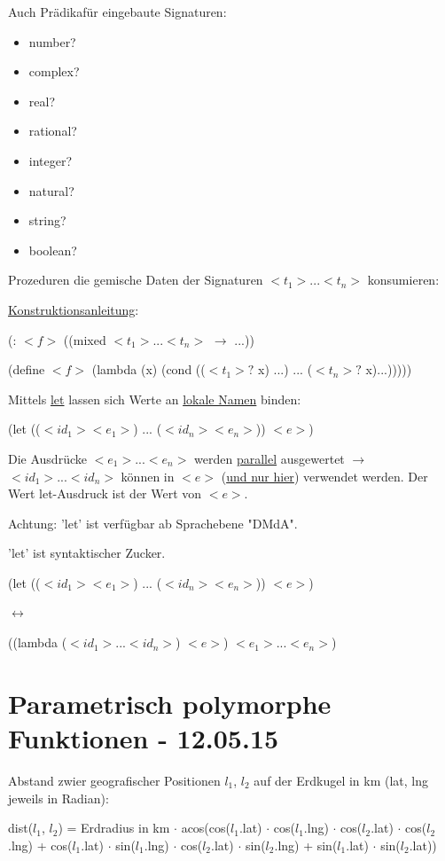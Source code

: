 \documentclass[a4paper, 20pt, openany]{book}
\begin{document}
Auch Prädikafür eingebaute Signaturen:

\begin{itemize}
  \item number?
  \item complex?
  \item real?
  \item rational?
  \item integer?
  \item natural?
  \item string?
  \item boolean?
\end{itemize}

Prozeduren die gemische Daten der Signaturen $<t_1>...<t_n>$ konsumieren:

\underline{Konstruktionsanleitung}:

(: $<f>$ ((mixed $<t_1>...<t_n>$ $\rightarrow$ ...))

(define $<f>$ (lambda (x) (cond (($<t_1>?$ x) ...) ... ($<t_n>?$ x)...)))))

Mittels \underline{let} lassen sich Werte an \underline{lokale Namen} binden:

\begin{center}
  (let (($<id_1> <e_1>$) ... ($<id_n> <e_n>$)) $<e>$)
\end{center}

Die Ausdrücke $<e_1>...<e_n>$ werden \underline{parallel} ausgewertet $\rightarrow$ $<id_1>...<id_n>$ können in $<e>$ (\underline{und nur hier}) verwendet werden. Der Wert let-Ausdruck ist der Wert von $<e>$.

Achtung: 'let' ist verfügbar ab Sprachebene "DMdA".

'let' ist syntaktischer Zucker.

(let (($<id_1> <e_1>$) ... ($<id_n> <e_n>$)) $<e>$)

$\leftrightarrow$

((lambda ($<id_1>...<id_n>$) $<e>$) $<e_1>...<e_n>$)

\chapter{Parametrisch polymorphe Funktionen - 12.05.15}
Abstand zwier geografischer Positionen $l_1$, $l_2$ auf der Erdkugel in km (lat, lng jeweils in Radian):

dist($l_1$, $l_2$) = Erdradius in km $\cdot$ acos(cos($l_1$.lat) $\cdot$ cos($l_1$.lng) $\cdot$ cos($l_2$.lat) $\cdot$ cos($l_2$.lng) + cos($l_1$.lat) $\cdot$ sin($l_1$.lng) $\cdot$ cos($l_2$.lat) $\cdot$ sin($l_2$.lng) + sin($l_1$.lat) $\cdot$ sin($l_2$.lat))
\end{document}

